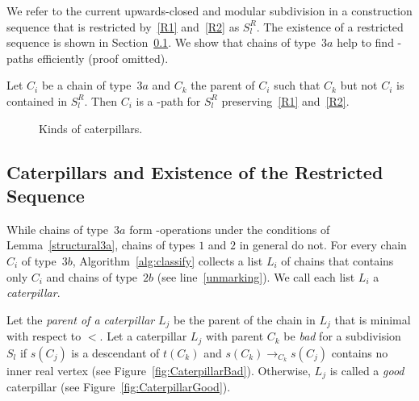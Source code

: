 We refer to the current upwards-closed and modular subdivision in a construction sequence that is restricted by~\ref{R1} and~\ref{R2} as $S^R_l$. The existence of a restricted sequence is shown in Section~\ref{caterpillars}.
We show that chains of type~$3a$ help to find \BG-paths efficiently (proof omitted).

\begin{lemma}\label{structural3a}
Let $C_i$ be a chain of type~$3a$ and $C_k$ the parent of $C_i$ such that $C_k$ but not $C_i$ is contained in $S^R_l$. Then $C_i$ is a \BG-path for $S^R_l$ preserving~\ref{R1} and~\ref{R2}.
\end{lemma}



\begin{wrapfigure}[14]{R}{5.7cm}
	\vspace{-0.5cm}
	\centering
\hspace{0.01cm}
	\caption{Kinds of caterpillars.}
	\label{fig:Caterpillar}
\end{wrapfigure}

\subsection{Caterpillars and Existence of the Restricted Sequence}\label{caterpillars}
While chains of type~$3a$ form \BG-operations under the conditions of Lemma~\ref{structural3a}, chains of types $1$ and $2$ in general do not. For every chain $C_i$ of type~$3b$, Algorithm~\ref{alg:classify} collects a list $L_i$ of chains that contains only $C_i$ and chains of type~$2b$ (see line~\ref{unmarking}). We call each list $L_i$ a \emph{caterpillar}.





\begin{definition}
Let the \emph{parent of a caterpillar} $L_j$ be the parent of the chain in $L_j$ that is minimal with respect to $<$.
Let a caterpillar $L_j$ with parent $C_k$ be \emph{bad} for a subdivision $S_l$ if $s(C_j)$ is a descendant of $t(C_k)$ and $s(C_k) \rightarrow_{C_k} s(C_j)$ contains no inner real vertex (see Figure~\ref{fig:CaterpillarBad}). Otherwise, $L_j$ is called a \emph{good} caterpillar (see Figure~\ref{fig:CaterpillarGood}).
\end{definition}

